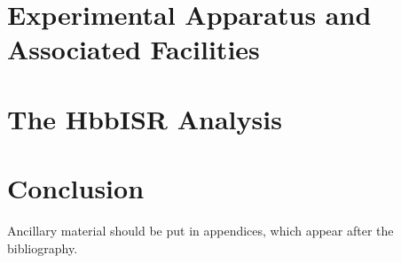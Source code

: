\documentclass[11pt]{ucthesis}
\begin{document}
\begin{spacing}{2.0}



\part{Experimental Apparatus and Associated Facilities}




\part{The HbbISR Analysis}
\label{part:HbbISR}









\part{Conclusion}


\printbibliography

\appendix



Ancillary material should be put in appendices, which appear after the
bibliography. 

\end{spacing}
\end{document}
